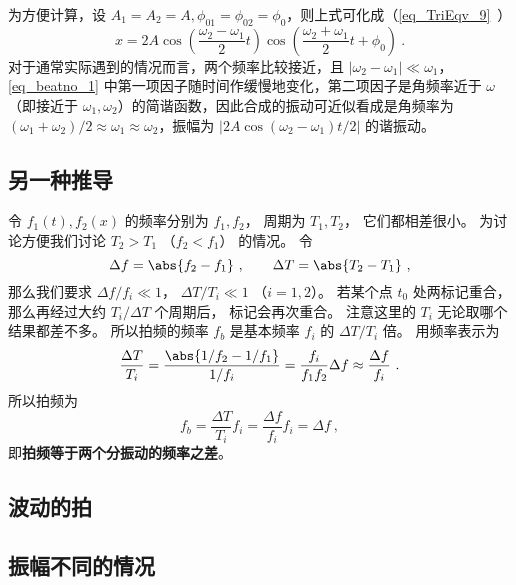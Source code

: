 为方便计算，设 $A_1=A_2=A,\phi_{01}=\phi_{02}=\phi_{0}$，则上式可化成（\autoref{eq_TriEqv_9}~）
\begin{equation} \label{eq_beatno_1}
x=2 A \cos \left(\frac{\omega_{2}-\omega_{1}}{2} t\right) \cos \left(\frac{\omega_{2}+\omega_{1}}{2} t+\phi_{0}\right)~.
\end{equation}
对于通常实际遇到的情况而言，两个频率比较接近，且 $\left|\omega_{2}-\omega_{1}\right|\ll \omega_1$，\autoref{eq_beatno_1} 中第一项因子随时间作缓慢地变化，第二项因子是角频率近于 $\omega$（即接近于 $\omega_1,\omega_2$）的简谐函数，因此合成的振动可近似看成是角频率为 $(\omega_{1}+\omega_{2})/2 \approx \omega_{1} \approx \omega_{2}$，振幅为 $\left | 2 A \cos (\omega_{2}-\omega_{1})t/{2} \right |$ 的谐振动。

\subsection{另一种推导}

令 $f_1(t), f_2(x)$ 的频率分别为 $f_1, f_2$， 周期为 $T_1, T_2$， 它们都相差很小。 为讨论方便我们讨论 $T_2 > T_1$ （$f_2 < f_1$） 的情况。 令
\begin{equation}
\Delta f = \abs{f_2 - f_1}~,
\qquad
\Delta T = \abs{T_2 - T_1}~,
\end{equation}
那么我们要求 $\Delta f/f_i \ll 1$， $\Delta T/T_i \ll 1$ （$i = 1,2$）。 若某个点 $t_0$ 处两标记重合， 那么再经过大约 $T_i/\Delta T$ 个周期后， 标记会再次重合。 注意这里的 $T_i$ 无论取哪个结果都差不多。 所以拍频的频率 $f_b$ 是基本频率 $f_i$ 的 $\Delta T/T_i$ 倍。 用频率表示为
\begin{equation}
\frac{\Delta T}{T_i} = \frac{\abs{1/f_2 - 1/f_1}}{1/f_i} = \frac{f_i}{f_1 f_2} \Delta f \approx \frac{\Delta f}{f_i}~.
\end{equation}
所以拍频为
\begin{equation}
f_b = \frac{\Delta T}{T_i}f_i = \frac{\Delta f}{f_i} f_i = \Delta f~,
\end{equation}
即\textbf{拍频等于两个分振动的频率之差}。

\subsection{波动的拍}

\subsection{振幅不同的情况}
